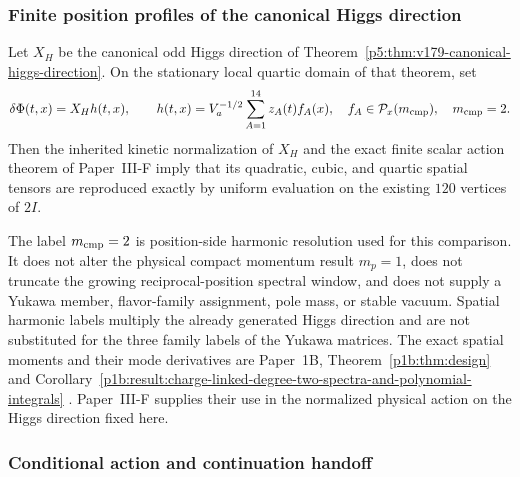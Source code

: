 \documentclass[12pt,a4paper]{article}
\begin{document}
\subsubsection{Finite position profiles of the canonical Higgs direction}
\label{p5:sec:v180-higgs-position-profile-action}

\begin{corollary}
\label{p5:cor:v180-exact-icosian-higgs-profile-action}
Let $X_H$ be the canonical odd Higgs direction of
Theorem~\ref{p5:thm:v179-canonical-higgs-direction}.  On the stationary local
quartic domain of that theorem, set
\[
 \delta\Phi(t,x)=X_Hh(t,x),\qquad
 h(t,x)=V_a^{-1/2}\sum_{A=1}^{14}z_A(t)f_A(x),
 \quad f_A\in\mathcal P_x(m_{\rm cmp}),\quad m_{\rm cmp}=2.
\]
Then the inherited kinetic normalization of $X_H$ and the exact finite scalar
action theorem of Paper~III-F imply that its quadratic, cubic, and quartic
spatial tensors are reproduced exactly by uniform evaluation on the existing
$120$ vertices of $2I$.

The label $m_{\rm cmp}=2$ is position-side harmonic resolution used for this
comparison.  It does not alter the physical compact momentum result $m_p=1$,
does not truncate the growing reciprocal-position spectral window, and does
not supply a Yukawa
member, flavor-family assignment, pole mass, or stable vacuum.  Spatial
harmonic labels multiply the already generated Higgs direction and are not
substituted for the three family labels of the Yukawa matrices.
The exact spatial moments and their mode derivatives are Paper~1B,
Theorem~\ref{p1b:thm:design} and
Corollary~\ref{p1b:result:charge-linked-degree-two-spectra-and-polynomial-integrals}
\cite{Kugelmann2026Paper1B}. Paper~III-F supplies their use in the
normalized physical action on the Higgs direction fixed here.
\end{corollary}


\subsubsection{Conditional action and continuation handoff}
\end{document}
